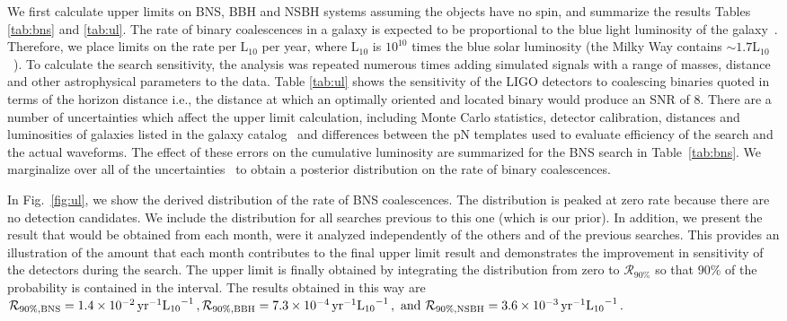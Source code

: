 We first calculate upper limits on \ac{BNS}, \ac{BBH} and \ac{NSBH}
systems assuming the objects have no spin, and summarize the results
Tables \ref{tab:bns} and \ref{tab:ul}.
The rate of binary coalescences in a galaxy is expected to
be proportional to the blue light luminosity of the
galaxy~\cite{LIGOS3S4Galaxies}.  Therefore, we place limits on the rate
per $\mathrm{L}_{10}$ per year, where $\mathrm{L}_{10}$ is $10^{10}$
times the blue solar luminosity (the Milky Way contains $\sim 1.7
\mathrm{L}_{10}$~\cite{Kalogera:2000dz}).  To calculate the search
sensitivity, the analysis was repeated numerous times adding simulated
signals with a range of masses, distance and other astrophysical
parameters to the data. Table \ref{tab:ul} shows the sensitivity of 
the LIGO detectors to coalescing binaries quoted in terms 
of the horizon distance i.e., the distance at which an optimally oriented 
and located binary would produce an \ac{SNR} of 8.  
%
There are a number of uncertainties which affect the upper limit
calculation, including Monte Carlo statistics, detector calibration,
distances and luminosities of galaxies listed in the galaxy
catalog~\cite{LIGOS3S4Galaxies} and differences between the \ac{pN}
templates used to evaluate efficiency of the search and the actual
waveforms.  The effect of these errors on the cumulative luminosity are
summarized for the \ac{BNS} search in Table~\ref{tab:bns}.  We
marginalize over all of the uncertainties~\cite{Fairhurst:2007qj}
to obtain a posterior distribution on the rate of
binary coalescences.  

In Fig.~\ref{fig:ul}, we show the derived distribution of the rate of
\ac{BNS} coalescences. The distribution is peaked at zero rate
because there are no detection candidates.  We include the distribution for
all searches previous to this one (which is our prior).  In addition, we
present the result that would be obtained from each month, were it
analyzed independently of the others and of the previous searches.  This
provides an illustration of the amount that each month contributes to
the final upper limit result and demonstrates the improvement in
sensitivity of the detectors during the search.  The upper limit is
finally obtained by integrating the distribution from zero to
$\mathcal{R}_{90\%}$ so that $90\%$ of the probability is contained in the
interval.  The results obtained in this way are
%
$\mathcal{R}_{90\%,{\rm BNS}} = 1.4 \times 10^{-2}\,
\textrm{yr}^{-1}\mathrm{L_{10}}^{-1} \, ,
\mathcal{R}_{90\%,{\rm BBH}} = 7.3 \times 10^{-4}\,
\textrm{yr}^{-1}\mathrm{L_{10}}^{-1} \, , \text{ and }
\mathcal{R}_{90\%,{\rm NSBH}} =  3.6 \times 10^{-3}\,
\textrm{yr}^{-1}\mathrm{L_{10}}^{-1} \, .$


